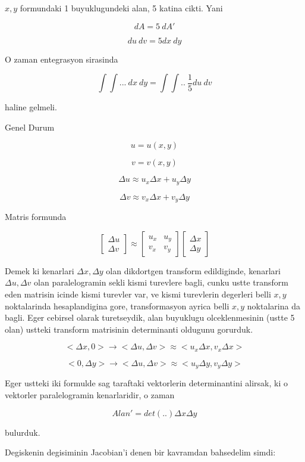 \documentclass[12pt,fleqn]{article}\usepackage{../common}
\begin{document}
$x,y$ formundaki 1 buyuklugundeki alan, 5 katina cikti. Yani 

\[ dA = 5 \ dA' \]

\[ du \ dv = 5 dx \ dy \]

O zaman entegrasyon sirasinda 

\[ \int \int ... \ dx \ dy = \int \int .. \ \frac{1}{5} du \ dv \]

haline gelmeli. 

Genel Durum 

\[ u = u(x,y) \]

\[ v = v(x,y)  \]

\[ \Delta u \approx u_x \Delta x + u_y \Delta y  \]

\[ \Delta v \approx v_x \Delta x + v_y \Delta y  \]

Matris formunda 

\[ 
\left[\begin{array}{r}
\Delta u \\
\Delta v 
\end{array}\right] \approx 
\left[\begin{array}{rr}
u_x & u_y \\
v_x & v_y
\end{array}\right] 
\left[\begin{array}{r}
\Delta x \\
\Delta y 
\end{array}\right] 
 \]

Demek ki kenarlari $\Delta x,\Delta y$ olan dikdortgen transform
edildiginde, kenarlari $\Delta u,\Delta v$ olan paralelogramin sekli kismi
turevlere bagli, cunku ustte transform eden matrisin icinde kismi turevler
var, ve kismi turevlerin degerleri belli $x,y$ noktalarinda hesaplandigina
gore, transformasyon ayrica belli $x,y$ noktalarina da bagli. Eger cebirsel
olarak turetseydik, alan buyuklugu olceklenmesinin (ustte 5 olan) ustteki
transform matrisinin determinanti oldugunu gorurduk. 

\[<\Delta x,0> \to <\Delta u, \Delta v> \approx <u_x \Delta x, v_x\Delta x> \]

\[ <0, \Delta y> \to <\Delta u,\Delta v> \approx <u_y\Delta y,v_y \Delta y> \]

Eger ustteki iki formulde sag taraftaki vektorlerin determinantini alirsak,
ki o vektorler paralelogramin kenarlaridir, o zaman 

\[ Alan' =  det(..)\Delta x \Delta y  \]

bulurduk. 

Degiskenin degisiminin Jacobian'i denen bir kavramdan bahsedelim simdi: 
\end{document}
